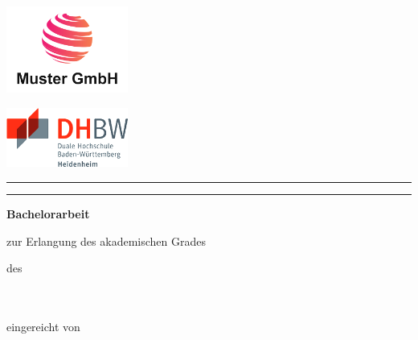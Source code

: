 \begin{titlepage}
    \noindent
    \begin{minipage}{0.45\textwidth}
        \includegraphics[width=4cm]{deckblatt/logos/company_logo.png}
    \end{minipage}
    \hfill
    \begin{minipage}{0.45\textwidth}
        \raggedleft
        \includegraphics[width=4cm]{deckblatt/logos/dhbw_logo.png}
    \end{minipage}

    \centering
    \vspace*{0.5cm}

    \begin{center}
    \rule{\textwidth}{0.6pt}
    \end{center}

    {\large\bfseries \projecttitle \par}

    \begin{center}
    \rule{\textwidth}{0.6pt}
    \end{center}

    {\large\bfseries Bachelorarbeit\par}

    \vspace{0.5cm}
    {\normalsize zur Erlangung des akademischen Grades\\[0.1cm]
    \textbf{\degree}}

    \vspace{0.5cm}
    {\normalsize des \degreeprogram\\
    \faculty\\
    \university\\
    \universitycity\par}
    
    \vspace{0.5cm}
    {\normalsize eingereicht von\\[0.1cm]
    \textbf{\studentname} \\
    \textbf{\studentaddress} \\
    \textbf{\studentcity} \\
    }


\end{titlepage}
